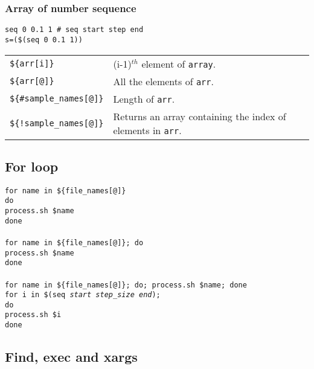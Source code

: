 \subsubsection{Array of number sequence}

\begin{mdframed}
\texttt{seq 0 0.1 1 \# seq start step end}\\
\texttt{s=(\$(seq 0 0.1 1))}
\end{mdframed}


\begin{tabularx}{\linewidth}{lX}
\texttt{\$\{arr[i]\}} & (i-1)$^{th}$ element of \texttt{array}.\\
\texttt{\$\{arr[@]\}} & All the elements of \texttt{arr}.\\
\texttt{\$\{\#sample\_names[@]\}} & Length of \texttt{arr}.\\
\texttt{\$\{!sample\_names[@]\}} & Returns an array containing the index of elements in \texttt{arr}.\\
\end{tabularx}

\subsection{For loop}


\begin{mdframed}
\texttt{for name in \$\{file\_names[@]\}}\\
\texttt{do}\\
\quad\texttt{process.sh \$name}\\
\texttt{done}\\
\null\\
\texttt{for name in \$\{file\_names[@]\}; do}\\
\quad\texttt{process.sh \$name}\\
\texttt{done}\\
\null\\
\texttt{for name in \$\{file\_names[@]\}; do; process.sh \$name; done }\\
\texttt{for i in \$(seq \textit{start} \textit{step\_size} \textit{end});}\\
\texttt{do}\\
\texttt{process.sh \$i}\\
\texttt{done}
\end{mdframed}




\subsection{Find, exec and xargs}

